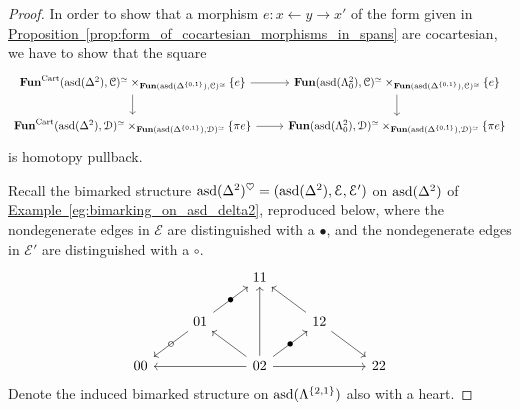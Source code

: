 \documentclass[main.tex]{subfiles}
\begin{document}
\begin{proof}
  In order to show that a morphism $e\colon x \leftarrow y \rightarrow x'$ of the form given in \hyperref[prop:form_of_cocartesian_morphisms_in_spans]{Proposition~\ref*{prop:form_of_cocartesian_morphisms_in_spans}} are cocartesian, we have to show that 
  the square
  \begin{equation*}
    \begin{tikzcd}
      \Fun^{\Cart}(\asd(\Delta^{2}), \category{C})^{\simeq} \times_{\Fun(\asd(\Delta^{\{0, 1\}}), \category{C})^{\simeq}} \{e\}
      \arrow[r]
      \arrow[d]
      & \Fun(\asd(\Lambda^{2}_{0}), \category{C})^{\simeq} \times_{\Fun(\asd(\Delta^{\{0, 1\}}), \category{C})^{\simeq}} \{e\}
      \arrow[d]
      \\
      \Fun^{\Cart}(\asd(\Delta^{2}), \category{D})^{\simeq} \times_{\Fun(\asd(\Delta^{\{0, 1\}}), \category{D})^{\simeq}} \{\pi e\}
      \arrow[r]
      & \Fun(\asd(\Lambda^{2}_{0}), \category{D})^{\simeq} \times_{\Fun(\asd(\Delta^{\{0, 1\}}), \category{D})^{\simeq}} \{\pi e\}
    \end{tikzcd}
  \end{equation*}
  is homotopy pullback.

  Recall the bimarked structure $\mathrm{asd}(\Delta^{2})^{\heartsuit} = (\mathrm{asd}(\Delta^{2}), \mathcal{E}, \mathcal{E}')$ on $\mathrm{asd}(\Delta^{2})$ of \hyperref[eg:bimarking_on_asd_delta2]{Example~\ref*{eg:bimarking_on_asd_delta2}}, reproduced below, where the nondegenerate edges in $\mathcal{E}$ are distinguished with a $\bullet$, and the nondegenerate edges in $\mathcal{E}'$ are distinguished with a $\circ$.
  \begin{equation*}
    \begin{tikzcd}
      && 11
      \\
      & 01
      \arrow[ur, "\bullet" marking]
      \arrow[dl, "\circ" marking]
      && 12
      \arrow[ul]
      \arrow[dr]
      \\
      00
      && 02
      \arrow[ll]
      \arrow[rr]
      \arrow[uu]
      \arrow[ur, "\bullet" marking]
      \arrow[ul]
      && 22
    \end{tikzcd}
  \end{equation*}
  Denote the induced bimarked structure on $\mathrm{asd}(\Lambda^{\{2, 1\}})$ also with a heart.


\end{proof}
\end{document}
